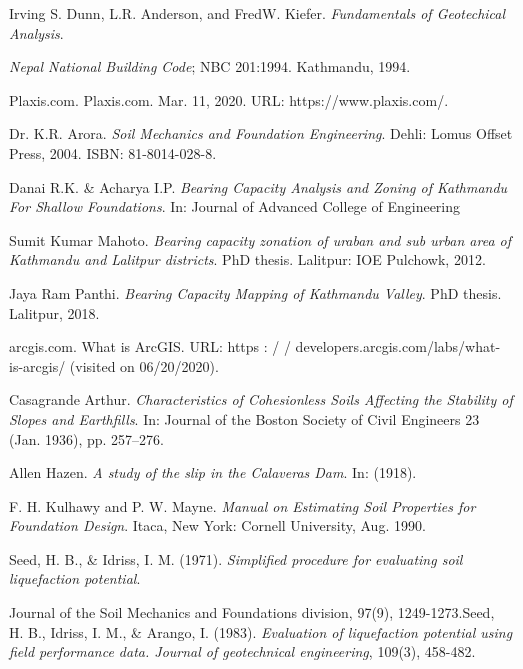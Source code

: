 \begin{thebibliography}{99}

Irving S. Dunn, L.R. Anderson, and FredW. Kiefer. \emph{Fundamentals of Geotechical Analysis}.

\emph{Nepal National Building Code}; NBC 201:1994. Kathmandu, 1994.

Plaxis.com. Plaxis.com. Mar. 11, 2020. URL: https://www.plaxis.com/.

Dr. K.R. Arora. \emph{Soil Mechanics and Foundation Engineering}. Dehli: Lomus Offset Press, 2004. ISBN: 81-8014-028-8.

Danai R.K. \& Acharya I.P. \emph{Bearing Capacity Analysis and Zoning of Kathmandu For Shallow Foundations}. In: Journal of Advanced College of Engineering

Sumit Kumar Mahoto. \emph{Bearing capacity zonation of uraban and sub urban area of Kathmandu and Lalitpur districts}. PhD thesis. Lalitpur: IOE Pulchowk, 2012.

Jaya Ram Panthi. \emph{Bearing Capacity Mapping of Kathmandu Valley}. PhD thesis. Lalitpur, 2018.

arcgis.com. What is ArcGIS. URL: https : / / developers.arcgis.com/labs/what-is-arcgis/ (visited on 06/20/2020).

Casagrande Arthur. \emph{Characteristics of Cohesionless Soils Affecting the Stability of Slopes and Earthfills}. In: Journal of the Boston Society of Civil Engineers 23 (Jan. 1936), pp. 257–276.

Allen Hazen. \emph{A study of the slip in the Calaveras Dam}. In: (1918).

F. H. Kulhawy and P. W. Mayne. \emph{Manual on Estimating Soil Properties for Foundation Design}. Itaca, New York: Cornell University, Aug. 1990.

Seed, H. B., \& Idriss, I. M. (1971). \emph{Simplified procedure for evaluating soil liquefaction potential}.

Journal of the Soil Mechanics and Foundations division, 97(9), 1249-1273.Seed, H. B., Idriss, I. M., \& Arango, I. (1983). \emph{Evaluation of liquefaction potential using field performance data. Journal of geotechnical engineering}, 109(3), 458-482.


\end{thebibliography}
